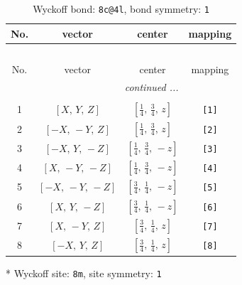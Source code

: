 \documentclass[fleqn,8pt]{jsarticle}
\begin{document}
\renewcommand{\arraystretch}{1.2}
\begin{longtable}{cccc}
\caption{Wyckoff bond: {\tt 8c@4l}, bond symmetry: {\tt 1}}
 \\
 \hline \hline
No. & vector & center & mapping \\ \hline \endfirsthead

\multicolumn{3}{l}{\tablename\ \thetable{}} \\
 \hline \hline
No. & vector & center & mapping \\ \hline \endhead

 \hline \hline
\multicolumn{3}{r}{\footnotesize\it continued ...} \\ \endfoot

 \hline \hline
\multicolumn{3}{r}{} \\ \endlastfoot

1 & $\left[ X,\, Y,\, Z \right]$ & $\left[ \frac{1}{4},\, \frac{3}{4},\, z \right]$ & {\tt [1]} \\ \hline
2 & $\left[ - X,\, - Y,\, Z \right]$ & $\left[ \frac{1}{4},\, \frac{3}{4},\, z \right]$ & {\tt [2]} \\ \hline
3 & $\left[ - X,\, Y,\, - Z \right]$ & $\left[ \frac{1}{4},\, \frac{3}{4},\, - z \right]$ & {\tt [3]} \\ \hline
4 & $\left[ X,\, - Y,\, - Z \right]$ & $\left[ \frac{1}{4},\, \frac{3}{4},\, - z \right]$ & {\tt [4]} \\ \hline
5 & $\left[ - X,\, - Y,\, - Z \right]$ & $\left[ \frac{3}{4},\, \frac{1}{4},\, - z \right]$ & {\tt [5]} \\ \hline
6 & $\left[ X,\, Y,\, - Z \right]$ & $\left[ \frac{3}{4},\, \frac{1}{4},\, - z \right]$ & {\tt [6]} \\ \hline
7 & $\left[ X,\, - Y,\, Z \right]$ & $\left[ \frac{3}{4},\, \frac{1}{4},\, z \right]$ & {\tt [7]} \\ \hline
8 & $\left[ - X,\, Y,\, Z \right]$ & $\left[ \frac{3}{4},\, \frac{1}{4},\, z \right]$ & {\tt [8]} \\
\end{longtable}
* Wyckoff site: {\tt 8m}, site symmetry: {\tt 1}
\renewcommand{\arraystretch}{1.2}
\end{document}
